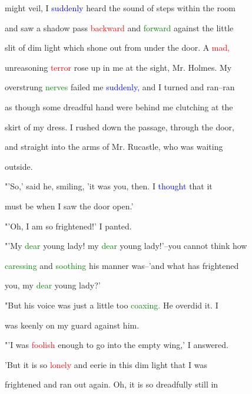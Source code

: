  might veil, I \textcolor{blue}{suddenly} heard the sound of steps within the room

 and saw a shadow pass \textcolor{red}{backward} and \textcolor{green}{forward} against the little

 slit of dim light which shone out from under the door. A \textcolor{red}{mad,}

 unreasoning \textcolor{red}{terror} rose up in me at the sight, Mr. Holmes. My

 overstrung \textcolor{green}{nerves} failed me \textcolor{blue}{suddenly,} and I turned and ran--ran

 as though some \textcolor{BurntOrange}{dreadful} hand were behind me clutching at the

 skirt of my dress. I rushed down the passage, through the door,

 and straight into the arms of Mr. Rucastle, who was \textcolor{BurntOrange}{waiting}

 outside.



 "'So,' said he, \textcolor{BurntOrange}{smiling,} 'it was you, then. I \textcolor{blue}{thought} that it

 must be when I saw the door open.'



 "'Oh, I am so \textcolor{BurntOrange}{frightened!'} I panted.



 "'My \textcolor{green}{dear} \textcolor{BurntOrange}{young} lady! my \textcolor{green}{dear} \textcolor{BurntOrange}{young} lady!'--you cannot think how

 \textcolor{green}{caressing} and \textcolor{green}{soothing} his manner was--'and what has \textcolor{BurntOrange}{frightened}

 you, my \textcolor{green}{dear} \textcolor{BurntOrange}{young} lady?'



 "But his voice was just a little too \textcolor{green}{coaxing.} He overdid it. I

 was keenly on my \textcolor{BurntOrange}{guard} against him.



 "'I was \textcolor{red}{foolish} enough to go into the empty wing,' I answered.

 'But it is so \textcolor{red}{lonely} and eerie in this dim light that I was

 \textcolor{BurntOrange}{frightened} and ran out again. Oh, it is so \textcolor{BurntOrange}{dreadfully} still in

